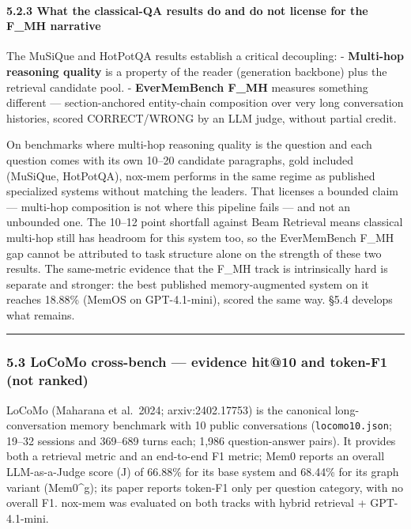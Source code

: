 \documentclass[
]{article}
\begin{document}
\paragraph{5.2.3 What the classical-QA results do and do not license for
the F\_MH
narrative}\label{what-the-classical-qa-results-do-and-do-not-license-for-the-f_mh-narrative}

The MuSiQue and HotPotQA results establish a critical decoupling: -
\textbf{Multi-hop reasoning quality} is a property of the reader
(generation backbone) plus the retrieval candidate pool. -
\textbf{EverMemBench F\_MH} measures something different ---
section-anchored entity-chain composition over very long conversation
histories, scored CORRECT/WRONG by an LLM judge, without partial credit.

On benchmarks where multi-hop reasoning quality is the question and each
question comes with its own 10--20 candidate paragraphs, gold included
(MuSiQue, HotPotQA), nox-mem performs in the same regime as published
specialized systems without matching the leaders. That licenses a
bounded claim --- multi-hop composition is not where this pipeline fails
--- and not an unbounded one. The 10--12 point shortfall against Beam
Retrieval means classical multi-hop still has headroom for this system
too, so the EverMemBench F\_MH gap cannot be attributed to task
structure alone on the strength of these two results. The same-metric
evidence that the F\_MH track is intrinsically hard is separate and
stronger: the best published memory-augmented system on it reaches
18.88\% (MemOS on GPT-4.1-mini), scored the same way. §5.4 develops what
remains.

\begin{center}\rule{0.5\linewidth}{0.5pt}\end{center}

\subsubsection{5.3 LoCoMo cross-bench --- evidence hit@10 and token-F1
(not
ranked)}\label{locomo-cross-bench-evidence-hit10-and-token-f1-not-ranked}

LoCoMo (Maharana et al.~2024; arxiv:2402.17753) is the canonical
long-conversation memory benchmark with 10 public conversations
(\texttt{locomo10.json}; 19--32 sessions and 369--689 turns each; 1,986
question-answer pairs). It provides both a retrieval metric and an
end-to-end F1 metric; Mem0 reports an overall LLM-as-a-Judge score (J)
of 66.88\% for its base system and 68.44\% for its graph variant
(Mem0\^{}g); its paper reports token-F1 only per question category, with
no overall F1. nox-mem was evaluated on both tracks with hybrid
retrieval + GPT-4.1-mini.
\end{document}
